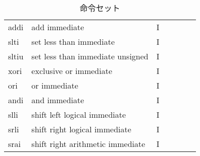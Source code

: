 \documentclass[../specifications.tex]{subfiles}
\begin{document}
\begin{table}[]
\begin{tabular}{lllllll}
    addi                     & add immediate                         & I                       &                       &                         &                              &                         \\
    slti                     & set less than immediate               & I                       &                       &                         &                              &                         \\
    sltiu                    & set less than immediate unsigned      & I                       &                       &                         &                              &                         \\
    xori                     & exclusive or immediate                & I                       &                       &                         &                              &                         \\
    ori                      & or immediate                          & I                       &                       &                         &                              &                         \\
    andi                     & and immediate                         & I                       &                       &                         &                              &                         \\
    slli                     & shift left logical immediate          & I                       &                       &                         &                              &                         \\
    srli                     & shift right logical immediate         & I                       &                       &                         &                              &                         \\
    srai                     & shift right arithmetic immediate      & I                       &                       &                         &                              &
    \end{tabular}
    \caption{命令セット}
    \label{table:isa}
  \end{table}
  
\end{document}
